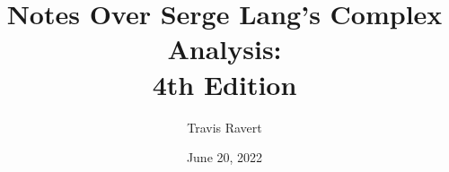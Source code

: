 \documentclass[10pt, openany]{book}
\begin{document}
	
	\author{Travis Ravert}
	\title{Notes Over Serge Lang's Complex Analysis: \\ 4th Edition}
	\date{June 20, 2022}
	\frontmatter
	\maketitle
	\tableofcontents
	\mainmatter
	
	
	\backmatter
\end{document}
